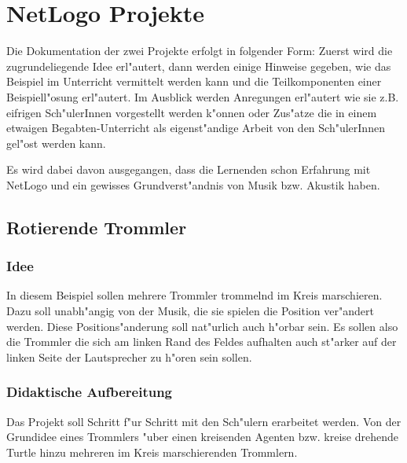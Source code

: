 \section{NetLogo Projekte}
Die Dokumentation der zwei Projekte erfolgt in folgender Form:
Zuerst wird die zugrundeliegende Idee erl"autert, dann werden einige Hinweise
gegeben, wie das Beispiel 
im Unterricht vermittelt werden kann und die Teilkomponenten
einer Beispiell"osung erl"autert. Im Ausblick werden Anregungen erl"autert wie
sie z.B. eifrigen Sch"ulerInnen vorgestellt werden k"onnen oder Zus"atze die
in einem etwaigen Begabten-Unterricht als eigenst"andige Arbeit von den
Sch"ulerInnen gel"ost werden kann. 

Es wird dabei davon ausgegangen, dass die Lernenden schon Erfahrung mit 
NetLogo und ein gewisses Grundverst"andnis von Musik bzw. Akustik haben. 
\subsection{Rotierende Trommler}
\label{Bsp:Trommler}
\subsubsection{Idee}
In diesem Beispiel sollen mehrere Trommler trommelnd im Kreis marschieren. Dazu
soll unabh"angig von der Musik, die sie spielen die Position ver"andert werden.
Diese Positions"anderung soll nat"urlich auch h"orbar sein. Es sollen also die
Trommler die sich am linken Rand des Feldes aufhalten auch st"arker auf der 
linken Seite der Lautsprecher zu h"oren sein sollen. 

\subsubsection{Didaktische Aufbereitung}
Das Projekt soll Schritt f"ur Schritt mit den Sch"ulern erarbeitet werden.
Von der Grundidee eines Trommlers "uber einen kreisenden Agenten bzw.
kreise drehende Turtle hinzu mehreren im Kreis marschierenden Trommlern.

